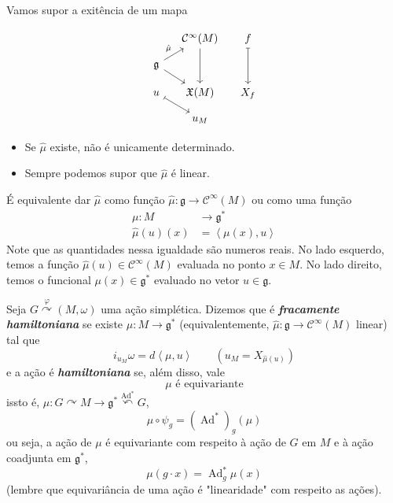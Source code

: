 Vamos supor a exitência de um mapa

\[\begin{tikzcd}[ column sep=small,row sep=small]
	&\mathcal{C}^\infty(M)\arrow[dd]& f\arrow[dd,maps to]\\
\mathfrak{g} \arrow[ur,"\hat{\mu}"]\arrow[dr]\\
u\arrow[dr, maps to]&\mathfrak{X}(M)&X_f\\
&u_M
\end{tikzcd}\]

\begin{remark}\leavevmode 
	\begin{itemize}
	\item Se $\hat{\mu}$ existe, não é unicamente determinado.
	\item Sempre podemos supor que $\hat{\mu}$ é linear.
	\end{itemize}
	\item É equivalente dar $\hat{\mu}$ como função $\hat{\mu}:\mathfrak{g} \longrightarrow \mathcal{C}^\infty(M)$ ou como uma função
		\begin{align*}
			\mu: M &\longrightarrow \mathfrak{g}^* \\
			\hat{\mu}(u)(x) & =\left<\mu(x),u\right>  
		\end{align*}
		Note que as quantidades nessa igualdade são numeros reais. No lado esquerdo, temos a função $\hat{\mu}(u)\in\mathcal{C}^\infty(M)$ evaluada no ponto $x\in M$. No lado direito, temos o funcional $\mu(x)\in\mathfrak{g}^*$ evaluado no vetor $u\in\mathfrak{g}$.
\end{remark}

\begin{defn}\leavevmode
	Seja $G\overset{\varphi}{\curvearrowright}(M,\omega)$ uma ação simplética. Dizemos que é \textit{\textbf{fracamente hamiltoniana}} se existe  $\mu:M\to \mathfrak{g}^*$ (equivalentemente, $\hat{ \mu}:\mathfrak{g} \longrightarrow \mathcal{C}^\infty(M)$ linear) tal que
	 \begin{equation}\label{eq:a}
	i_{u_M}\omega=d\left<\mu,u\right> \qquad (u_M=X_{\hat{\mu}(u)})	 	
	 \end{equation}
	e a ação é \textit{\textbf{hamiltoniana}} se, além disso, vale
	\begin{equation}\label{eq:b}
		\mu\text{ é equivariante} 
	\end{equation}
	issto é, $\mu:G \curvearrowright M\longrightarrow \mathfrak{g}^*  \overset{\operatorname{Ad}^*}{\curvearrowleft}G$,
	\[\mu\circ \psi_g=(\operatorname{Ad}^*)_g(\mu)\]
	{\color{3}ou seja, a ação de $\mu$ é equivariante com respeito à ação de $G$ em $M$ e à ação coadjunta em $\mathfrak{g}^*$,
	\[\mu(g\cdot x)=\operatorname{Ad}^*_g\mu(x)\]
(lembre que equivariância de uma ação é "linearidade" com respeito as ações).}
\end{defn}

